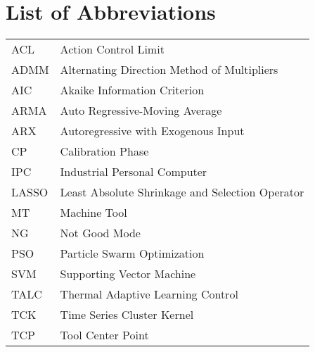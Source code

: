 \chapter*{List of Abbreviations}


\begin{tabular}{ll} 


ACL & \hspace{1cm} Action Control Limit\\
ADMM & \hspace{1cm} Alternating Direction Method of Multipliers\\
AIC & \hspace{1cm} Akaike Information Criterion\\
ARMA & \hspace{1cm} Auto Regressive-Moving Average \\
ARX & \hspace{1cm} Autoregressive with Exogenous Input\\
CP & \hspace{1cm} Calibration Phase\\
IPC & \hspace{1cm} Industrial Personal Computer\\
LASSO & \hspace{1cm} Least Absolute Shrinkage and Selection Operator\\
MT & \hspace{1cm} Machine Tool\\
NG & \hspace{1cm} Not Good Mode\\
PSO & \hspace{1cm} Particle Swarm Optimization\\
SVM & \hspace{1cm} Supporting Vector Machine\\
TALC & \hspace{1cm} Thermal Adaptive Learning Control\\
TCK & \hspace{1cm} Time Series Cluster Kernel\\
TCP & \hspace{1cm} Tool Center Point\\


\end{tabular}
\label{tab:einflusparameter}






 
